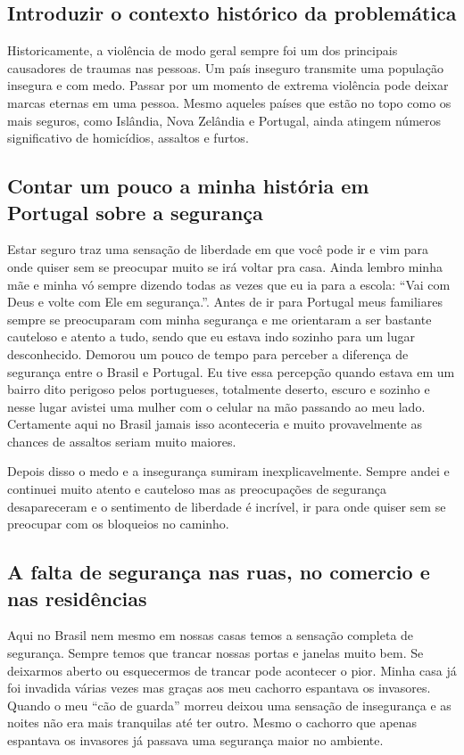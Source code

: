 \documentclass[12pt,a4paper]{article}
\begin{document}
    \subsection{Introduzir o contexto histórico da problemática}
    Historicamente, a violência de modo geral sempre foi um dos principais causadores de traumas nas pessoas. Um país inseguro transmite uma população insegura e com medo. Passar por um momento de extrema violência pode deixar marcas eternas em uma pessoa. Mesmo aqueles países que estão no topo como os mais seguros, como Islândia, Nova Zelândia e Portugal, ainda atingem números significativo de homicídios, assaltos e furtos.

    \subsection{Contar um pouco a minha história em Portugal sobre a segurança}
    Estar seguro traz uma sensação de liberdade em que você pode ir e vim para onde quiser sem se preocupar muito se irá voltar pra casa. Ainda lembro minha mãe e minha vó sempre dizendo todas as vezes que eu ia para a escola: “Vai com Deus e volte com Ele em segurança.”. Antes de ir para Portugal meus familiares sempre se preocuparam com minha segurança e me orientaram a ser bastante cauteloso e atento a tudo, sendo que eu estava indo sozinho para um lugar desconhecido. Demorou um pouco de tempo para perceber a diferença de segurança entre o Brasil e Portugal. Eu tive essa percepção quando estava em um bairro dito perigoso pelos portugueses, totalmente deserto, escuro e sozinho e nesse lugar avistei uma mulher com o celular na mão passando ao meu lado. Certamente aqui no Brasil jamais isso aconteceria e muito provavelmente as chances de assaltos seriam muito maiores. 

    Depois disso o medo e a insegurança sumiram inexplicavelmente. Sempre andei e continuei muito atento e cauteloso mas as preocupações de segurança desapareceram e o sentimento de liberdade é incrível, ir para onde quiser sem se preocupar com os bloqueios no caminho.

    \subsection{A falta de segurança nas ruas, no comercio e nas residências}
    Aqui no Brasil nem mesmo em nossas casas temos a sensação completa de segurança. Sempre temos que trancar nossas portas e janelas muito bem. Se deixarmos aberto ou esquecermos de trancar pode acontecer o pior. Minha casa já foi invadida várias vezes mas graças aos meu cachorro espantava os invasores. Quando o meu “cão de guarda” morreu deixou uma sensação de insegurança e as noites não era mais tranquilas até ter outro. Mesmo o cachorro que apenas espantava os invasores já passava uma segurança maior no ambiente. 
\end{document}
